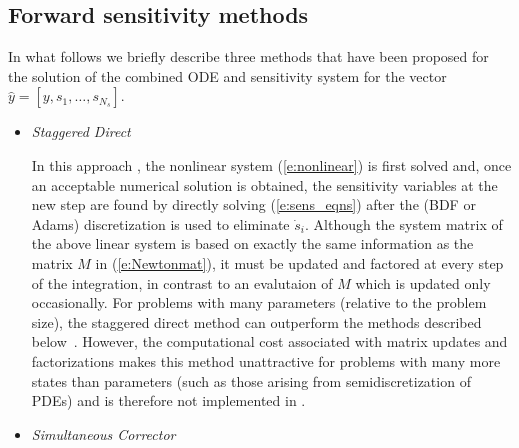 \subsection{Forward sensitivity methods}
In what follows we briefly describe three methods that have been proposed for the 
solution of the combined ODE and sensitivity system for the vector
${\hat y} = [y, s_1, \ldots , s_{N_s}]$.

\begin{itemize}

\item {\em Staggered Direct}

  In this approach \cite{CaSt:85}, the nonlinear system
  (\ref{e:nonlinear}) is first solved and, once an acceptable
  numerical solution is obtained, the sensitivity variables at the new
  step are found by directly solving (\ref{e:sens_eqns}) after the
  (BDF or Adams) discretization is used to eliminate ${\dot s}_i$.
  Although the system matrix of the above linear system is based on
  exactly the same information as the matrix $M$ in
  (\ref{e:Newtonmat}), it must be updated and factored at every step
  of the integration, in contrast to an evalutaion of $M$ which is
  updated only occasionally.  For problems with many parameters
  (relative to the problem size), the staggered direct method can
  outperform the methods described below~\cite{LPZ:99}.  However, the
  computational cost associated with matrix updates and factorizations
  makes this method unattractive for problems with many more states
  than parameters (such as those arising from semidiscretization of
  PDEs) and is therefore not implemented in {\cvodes}.
  
\item {\em Simultaneous Corrector}


\end{itemize}
